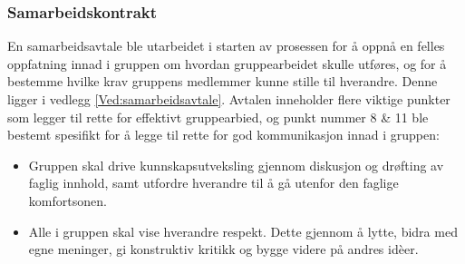\subsubsection{Samarbeidskontrakt}

En samarbeidsavtale ble utarbeidet i starten av prosessen for å oppnå en felles oppfatning innad i gruppen om hvordan gruppearbeidet skulle utføres, og for å bestemme hvilke krav gruppens medlemmer kunne stille til hverandre.
Denne ligger i vedlegg \ref{Ved:samarbeidsavtale}.
Avtalen inneholder flere viktige punkter som legger til rette for effektivt gruppearbied, og punkt nummer 8 \& 11 ble bestemt spesifikt for å legge til rette for god kommunikasjon innad i gruppen:
\begin{itemize}
	\item Gruppen skal drive kunnskapsutveksling gjennom diskusjon og drøfting av faglig innhold, samt utfordre hverandre til å gå utenfor den faglige komfortsonen.
	\item Alle i gruppen skal vise hverandre respekt. Dette gjennom å lytte, bidra med egne meninger, gi konstruktiv kritikk og bygge videre på andres id\`{e}er.
\end{itemize}

